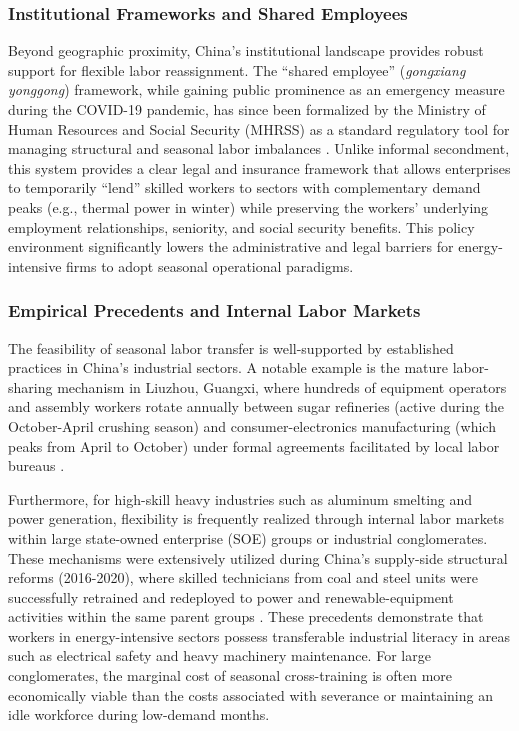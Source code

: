 \documentclass[preprint,12pt]{elsarticle}
\begin{document}
\subsubsection{Institutional Frameworks and Shared Employees}
Beyond geographic proximity, China's institutional landscape provides robust support for flexible labor reassignment. The ``shared employee'' (\textit{gongxiang yonggong}) framework, while gaining public prominence as an emergency measure during the COVID-19 pandemic, has since been formalized by the Ministry of Human Resources and Social Security (MHRSS) as a standard regulatory tool for managing structural and seasonal labor imbalances \citep{mohrss2020_shared_employment}. Unlike informal secondment, this system provides a clear legal and insurance framework that allows enterprises to temporarily ``lend'' skilled workers to sectors with complementary demand peaks (e.g., thermal power in winter) while preserving the workers' underlying employment relationships, seniority, and social security benefits. This policy environment significantly lowers the administrative and legal barriers for energy-intensive firms to adopt seasonal operational paradigms.

\subsubsection{Empirical Precedents and Internal Labor Markets}
The feasibility of seasonal labor transfer is well-supported by established practices in China's industrial sectors. A notable example is the mature labor-sharing mechanism in Liuzhou, Guangxi, where hundreds of equipment operators and assembly workers rotate annually between sugar refineries (active during the October-April crushing season) and consumer-electronics manufacturing (which peaks from April to October) under formal agreements facilitated by local labor bureaus \citep{liuzhou2022_shared_employment}. 

Furthermore, for high-skill heavy industries such as aluminum smelting and power generation, flexibility is frequently realized through internal labor markets within large state-owned enterprise (SOE) groups or industrial conglomerates. These mechanisms were extensively utilized during China's supply-side structural reforms (2016-2020), where skilled technicians from coal and steel units were successfully retrained and redeployed to power and renewable-equipment activities within the same parent groups \citep{mohrss2016_steel_coal_resettlement, undp2023_china_just_transition}. These precedents demonstrate that workers in energy-intensive sectors possess transferable industrial literacy in areas such as electrical safety and heavy machinery maintenance. For large conglomerates, the marginal cost of seasonal cross-training is often more economically viable than the costs associated with severance or maintaining an idle workforce during low-demand months.
\end{document}
